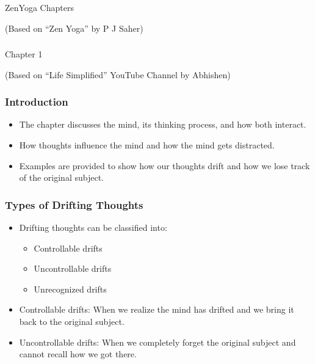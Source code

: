 \begin{frame}[fragile]\frametitle{}
\begin{center}
{\Large ZenYoga Chapters}


{\tiny (Based on ``Zen Yoga'' by P J Saher)}
\end{center}
\end{frame}


\begin{frame}[fragile]\frametitle{}
\begin{center}
{\Large Chapter 1}

{\tiny (Based on ``Life Simplified'' YouTube Channel by Abhishen)}

\end{center}
\end{frame}

\begin{frame}[fragile]\frametitle{Introduction}

\begin{itemize}
    \item The chapter discusses the mind, its thinking process, and how both interact.
    \item How thoughts influence the mind and how the mind gets distracted.
    \item Examples are provided to show how our thoughts drift and how we lose track of the original subject.
\end{itemize}

\end{frame}


\begin{frame}[fragile]\frametitle{Types of Drifting Thoughts}

\begin{itemize}
    \item Drifting thoughts can be classified into:
    \begin{itemize}
        \item Controllable drifts
        \item Uncontrollable drifts
        \item Unrecognized drifts
    \end{itemize}
    \item Controllable drifts: When we realize the mind has drifted and we bring it back to the original subject.
    \item Uncontrollable drifts: When we completely forget the original subject and cannot recall how we got there.
\end{itemize}

\end{frame}

